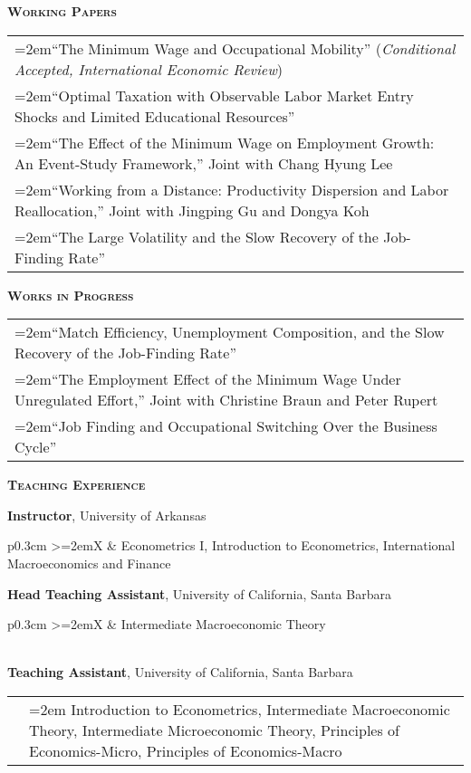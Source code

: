 \documentclass[11pt]{article}
\newenvironment{rSection}[1]{ %
  {\large\bf\textsc{#1}}
  \vspace{0.15cm}
  \begin{list}{}{ %
    \setlength{\leftmargin}{1.5em} %
    \setlength{\rightmargin}{1.5em}
  }
  \item[]
}{
  \end{list}
  \vspace{0.15cm}
}
\begin{document}
\begin{rSection}{Working Papers}
\begin{tabularx}{\linewidth}{>{\hangindent=2em}X}
``The Minimum Wage and Occupational Mobility'' (\emph{Conditional Accepted, International Economic Review})\\
``Optimal Taxation with Observable Labor Market Entry Shocks and Limited Educational Resources''\\
``The Effect of the Minimum Wage on Employment Growth: An Event-Study Framework,'' Joint with Chang Hyung Lee\\
``Working from a Distance: Productivity Dispersion and Labor Reallocation,'' Joint with Jingping Gu and Dongya Koh\\
``The Large Volatility and the Slow Recovery of the Job-Finding Rate''
\end{tabularx}
\end{rSection}

\begin{rSection}{Works in Progress}
\begin{tabularx}{\linewidth}{>{\hangindent=2em}X}
``Match Efficiency, Unemployment Composition, and the Slow Recovery of the Job-Finding Rate''\\
``The Employment Effect of the Minimum Wage Under Unregulated Effort,'' Joint with Christine Braun and Peter Rupert\\
``Job Finding and Occupational Switching Over the Business Cycle''
\end{tabularx}
\end{rSection}

\begin{rSection}{Teaching Experience}
{\bf Instructor}, University of Arkansas\\
\begin{tabularx}{\linewidth}{p{0.3cm} >{\hangindent=2em}X}
& Econometrics I, Introduction to Econometrics, International Macroeconomics and Finance\\[0.3cm]
\end{tabularx}
{\bf Head Teaching Assistant}, University of California, Santa Barbara\\
\begin{tabularx}{\linewidth}{p{0.3cm} >{\hangindent=2em}X}
& Intermediate Macroeconomic Theory\\
\end{tabularx}
\\[0.3cm]
{\bf Teaching Assistant}, University of California, Santa Barbara\\
\begin{tabularx}{\linewidth}{p{0.3cm} >{\hangindent=2em}X}
& Introduction to Econometrics, Intermediate Macroeconomic Theory, Intermediate Microeconomic Theory, Principles of Economics-Micro, Principles of Economics-Macro\\
\end{tabularx}
\end{rSection}
\end{document}
